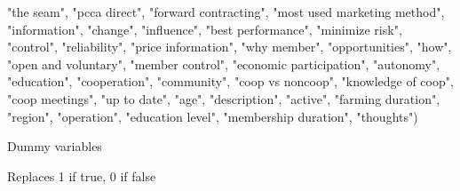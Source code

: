 \documentclass[
]{article}
\newenvironment{Shaded}{\begin{snugshade}}{\end{snugshade}}
\newcommand{\NormalTok}[1]{#1}
\newcommand{\StringTok}[1]{\textcolor[rgb]{0.31,0.60,0.02}{#1}}
\begin{document}
\begin{Shaded}
\begin{Highlighting}[]
    \StringTok{"the seam"}\NormalTok{, }\StringTok{"pcca direct"}\NormalTok{, }\StringTok{"forward contracting"}\NormalTok{, }\StringTok{"most used marketing method"}\NormalTok{,}
    \StringTok{"information"}\NormalTok{, }\StringTok{"change"}\NormalTok{, }\StringTok{"influence"}\NormalTok{, }\StringTok{"best performance"}\NormalTok{,}
    \StringTok{"minimize risk"}\NormalTok{, }\StringTok{"control"}\NormalTok{, }\StringTok{"reliability"}\NormalTok{, }\StringTok{"price information"}\NormalTok{,}
    \StringTok{"why member"}\NormalTok{, }\StringTok{"opportunities"}\NormalTok{, }\StringTok{"how"}\NormalTok{, }\StringTok{"open and voluntary"}\NormalTok{,}
    \StringTok{"member control"}\NormalTok{, }\StringTok{"economic participation"}\NormalTok{, }\StringTok{"autonomy"}\NormalTok{, }\StringTok{"education"}\NormalTok{,}
    \StringTok{"cooperation"}\NormalTok{, }\StringTok{"community"}\NormalTok{, }\StringTok{"coop vs noncoop"}\NormalTok{, }\StringTok{"knowledge of coop"}\NormalTok{,}
    \StringTok{"coop meetings"}\NormalTok{, }\StringTok{"up to date"}\NormalTok{, }\StringTok{"age"}\NormalTok{, }\StringTok{"description"}\NormalTok{, }\StringTok{"active"}\NormalTok{,}
    \StringTok{"farming duration"}\NormalTok{, }\StringTok{"region"}\NormalTok{, }\StringTok{"operation"}\NormalTok{, }\StringTok{"education level"}\NormalTok{,}
    \StringTok{"membership duration"}\NormalTok{, }\StringTok{"thoughts"}\NormalTok{)}
\end{Highlighting}
\end{Shaded}

Dummy variables

Replaces 1 if true, 0 if false
\end{document}
